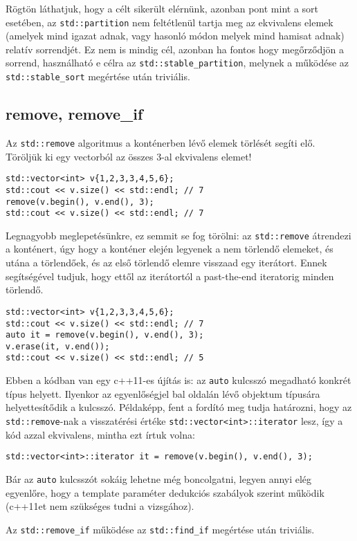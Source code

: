 \documentclass[../cpp_book/cpp_book.tex]{subfiles}
\begin{document}
	Rögtön láthatjuk, hogy a célt sikerült elérnünk, azonban pont mint a sort esetében, az \texttt{std::partition} nem feltétlenül tartja meg az ekvivalens elemek (amelyek mind igazat adnak, vagy hasonló módon melyek mind hamisat adnak) relatív sorrendjét. Ez nem is mindig cél, azonban ha fontos hogy megőrződjön a sorrend, használható e célra az \texttt{std::stable\_partition}, melynek a működése az \texttt{std::stable\_sort} megértése után triviális.
	\subsection{remove, remove\_if}
	Az \texttt{std::remove} algoritmus a konténerben lévő elemek törlését segíti elő. Töröljük ki egy vectorból az összes 3-al ekvivalens elemet!
	\begin{lstlisting}
std::vector<int> v{1,2,3,3,4,5,6};
std::cout << v.size() << std::endl; // 7
remove(v.begin(), v.end(), 3);
std::cout << v.size() << std::endl; // 7
	\end{lstlisting}
	Legnagyobb meglepetésünkre, ez semmit se fog törölni: az \texttt{std::remove} átrendezi a konténert, úgy hogy a konténer elején legyenek a nem törlendő elemeket, és utána a törlendőek, és az első törlendő elemre visszaad egy iterátort. Ennek segítségével tudjuk, hogy ettől az iterátortól a past-the-end iteratorig minden törlendő.
	\begin{lstlisting}
std::vector<int> v{1,2,3,3,4,5,6};
std::cout << v.size() << std::endl; // 7
auto it = remove(v.begin(), v.end(), 3);
v.erase(it, v.end());
std::cout << v.size() << std::endl; // 5
	\end{lstlisting}
	\begin{note}
		Ebben a kódban van egy c++11-es újítás is: az \texttt{auto} kulcsszó megadható konkrét típus helyett. Ilyenkor az egyenlőségjel bal oldalán lévő objektum típusára helyettesítődik a kulcsszó. Példaképp, fent a fordító meg tudja határozni, hogy az \texttt{std::remove}-nak a visszatérési értéke \texttt{std::vector<int>::iterator} lesz, így a kód azzal ekvivalens, mintha ezt írtuk volna:
		
		{\centering\texttt{std::vector<int>::iterator it = remove(v.begin(), v.end(), 3);} \par}
		
		Bár az \texttt{auto} kulcsszót sokáig lehetne még boncolgatni, legyen annyi elég egyenlőre, hogy a template paraméter dedukciós szabályok szerint működik (c++11et nem szükséges tudni a vizsgához).
	\end{note}
	Az \texttt{std::remove\_if} működése az \texttt{std::find\_if} megértése után triviális.
	
\end{document}
